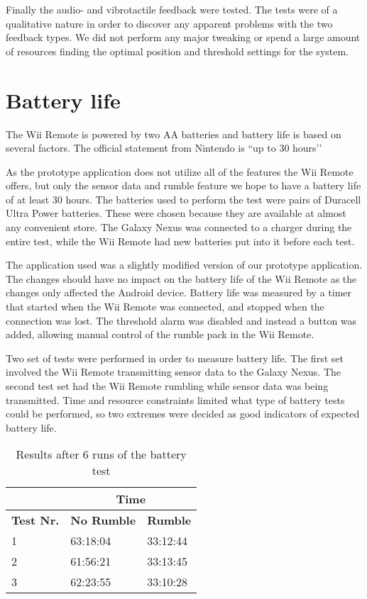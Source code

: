 Finally the audio- and vibrotactile feedback were tested. The tests were of a qualitative nature in order to discover any apparent problems with the two feedback types.  We did not perform any major tweaking or spend a large amount of resources finding the optimal position and threshold settings for the system.

\section{Battery life}
The Wii Remote is powered by two AA batteries and battery life is based on several factors. The official statement from Nintendo is ``up to 30 hours’’ \cite{wiiBattery}

As the prototype application does not utilize all of the features the Wii Remote offers, but only the sensor data and rumble feature we hope to have a battery life of at least 30 hours. The batteries used to perform the test were pairs of Duracell Ultra Power batteries. These were chosen because they are available at almost any convenient store. The Galaxy Nexus was connected to a charger during the entire test, while the Wii Remote had new batteries put into it before each test.

The application used was a slightly modified version of our prototype application. The changes should have no impact on the battery life of the Wii Remote as the changes only affected the Android device. Battery life was measured by a timer that started when the Wii Remote was connected,  and stopped when the connection was lost. The threshold alarm was disabled and instead a button was added, allowing manual control of the rumble pack in the Wii Remote.

Two set of tests were performed in order to measure battery life. The first set involved the Wii Remote transmitting sensor data to the Galaxy Nexus. The second test set had the Wii Remote rumbling while sensor data was being transmitted. Time and resource constraints limited what type of battery tests could be performed, so two extremes were decided as good indicators of expected battery life. 

\begin{table}[h]
\centering
\setlength{\extrarowheight}{0,2cm}
\begin{tabular}{p{2cm}|p{4.75cm}|p{4.75cm}|}
\cline{2-3}
&\multicolumn{2}{c|}{\textbf{Time}}\\ \hline
\textbf{Test Nr.} &\textbf{No Rumble} & \textbf{Rumble} \\ \hline
1 & 63:18:04 & 33:12:44 \\ \hline
2 & 61:56:21 & 33:13:45 \\ \hline
3 & 62:23:55 & 33:10:28 \\ \hline
\end{tabular}
\caption{Results after 6 runs of the battery test}
\label{tab:batteryLife}
\end{table}


